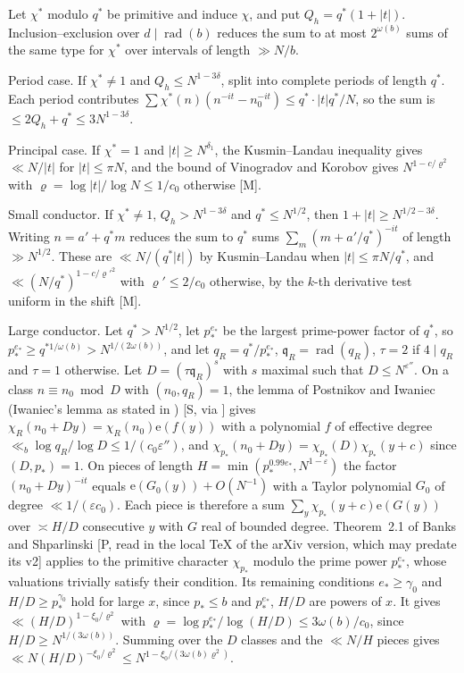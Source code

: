 \documentclass[11pt]{amsart}
\makeatletter
\theoremstyle{definition}
\numberwithin{equation}{section}
\renewenvironment{proof}[1][\proofname]{\par\pushQED{\qed}\normalfont\topsep6\p@\@plus6\p@\relax\trivlist\item[\hskip\labelsep\upshape#1.]\ignorespaces}{\popQED\endtrivlist\@endpefalse}
\newcommand{\e}{\mathrm{e}}
\newcommand{\rad}{\operatorname{rad}}
\makeatother
\begin{document}
\begin{proof}
Let $\chi^*$ modulo $q^*$ be primitive and induce $\chi$, and put $Q_h=q^*(1+|t|)$. Inclusion--exclusion over $d\mid\rad(b)$ reduces the sum to at most $2^{\omega(b)}$ sums of the same type for $\chi^*$ over intervals of length $\gg N/b$.

Period case. If $\chi^*\ne1$ and $Q_h\le N^{1-3\delta}$, split into complete periods of length $q^*$. Each period contributes $\sum\chi^*(n)(n^{-it}-n_0^{-it})\le q^*\cdot|t|q^*/N$, so the sum is $\le2Q_h+q^*\le3N^{1-3\delta}$.

Principal case. If $\chi^*=1$ and $|t|\ge N^{\delta_1}$, the Kusmin--Landau inequality gives $\ll N/|t|$ for $|t|\le\pi N$, and the bound of Vinogradov and Korobov gives $N^{1-c/\varrho^2}$ with $\varrho=\log|t|/\log N\le1/c_0$ otherwise [M].

Small conductor. If $\chi^*\ne1$, $Q_h>N^{1-3\delta}$ and $q^*\le N^{1/2}$, then $1+|t|\ge N^{1/2-3\delta}$. Writing $n=a'+q^*m$ reduces the sum to $q^*$ sums $\sum_m(m+a'/q^*)^{-it}$ of length $\gg N^{1/2}$. These are $\ll N/(q^*|t|)$ by Kusmin--Landau when $|t|\le\pi N/q^*$, and $\ll(N/q^*)^{1-c/\varrho'^2}$ with $\varrho'\le2/c_0$ otherwise, by the $k$-th derivative test uniform in the shift [M].

Large conductor. Let $q^*>N^{1/2}$, let $p_*^{e_*}$ be the largest prime-power factor of $q^*$, so $p_*^{e_*}\ge q^{*1/\omega(b)}>N^{1/(2\omega(b))}$, and let $q_R=q^*/p_*^{e_*}$, $\mathfrak q_R=\rad(q_R)$, $\tau=2$ if $4\mid q_R$ and $\tau=1$ otherwise. Let $D=(\tau\mathfrak q_R)^s$ with $s$ maximal such that $D\le N^{\varepsilon''}$. On a class $n\equiv n_0\bmod D$ with $(n_0,q_R)=1$, the lemma of Postnikov and Iwaniec (Iwaniec's lemma as stated in \cite[\S4]{BS}) [S, via \cite{BS}] gives $\chi_R(n_0+Dy)=\chi_R(n_0)\e(f(y))$ with a polynomial $f$ of effective degree $\ll_b\log q_R/\log D\le1/(c_0\varepsilon'')$, and $\chi_{p_*}(n_0+Dy)=\chi_{p_*}(D)\chi_{p_*}(y+c)$ since $(D,p_*)=1$. On pieces of length $H=\min(p_*^{0.99e_*},N^{1-\varepsilon})$ the factor $(n_0+Dy)^{-it}$ equals $\e(G_0(y))+O(N^{-1})$ with a Taylor polynomial $G_0$ of degree $\ll1/(\varepsilon c_0)$. Each piece is therefore a sum $\sum_y\chi_{p_*}(y+c)\e(G(y))$ over $\asymp H/D$ consecutive $y$ with $G$ real of bounded degree. Theorem~2.1 of Banks and Shparlinski \cite{BS} [P, read in the local TeX of the arXiv version, which may predate its v2] applies to the primitive character $\chi_{p_*}$ modulo the prime power $p_*^{e_*}$, whose valuations trivially satisfy their condition. Its remaining conditions $e_*\ge\gamma_0$ and $H/D\ge p_*^{\gamma_0}$ hold for large $x$, since $p_*\le b$ and $p_*^{e_*}$, $H/D$ are powers of $x$. It gives $\ll(H/D)^{1-\xi_0/\varrho^2}$ with $\varrho=\log p_*^{e_*}/\log(H/D)\le3\omega(b)/c_0$, since $H/D\ge N^{1/(3\omega(b))}$. Summing over the $D$ classes and the $\ll N/H$ pieces gives $\ll N(H/D)^{-\xi_0/\varrho^2}\le N^{1-\xi_0/(3\omega(b)\varrho^2)}$.
\end{proof}
\end{document}
